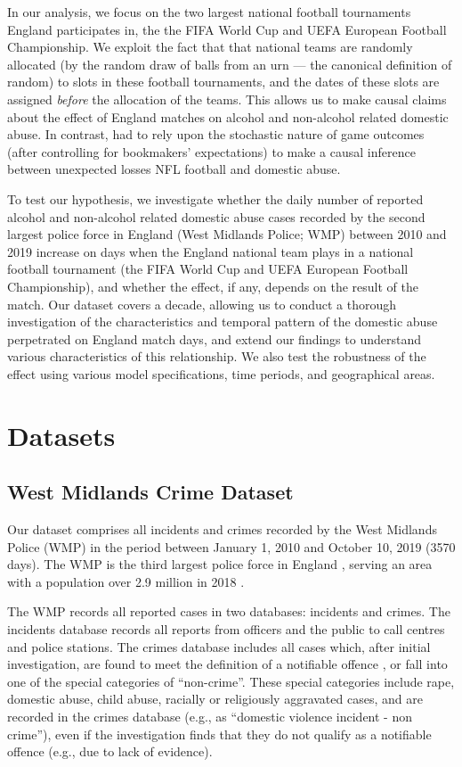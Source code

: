 \documentclass[12pt, a4paper]{article}
\begin{document}
In our analysis, we focus on the two largest national football tournaments England participates in, the the FIFA World Cup and UEFA European Football Championship. We exploit the fact that that national teams are randomly allocated (by the random draw of balls from an urn --- the canonical definition of random) to slots in these football tournaments, and the dates of these slots are assigned \emph{before} the allocation of the teams. This allows us to make causal claims about the effect of England matches on alcohol and non-alcohol related domestic abuse. In contrast,  had to rely upon the stochastic nature of game outcomes (after controlling for bookmakers' expectations) to make a causal inference between unexpected losses NFL football and domestic abuse. 

To test our hypothesis, we investigate whether the daily number of reported alcohol and non-alcohol related domestic abuse cases recorded by the second largest police force in England (West Midlands Police; WMP) between 2010 and 2019 increase on days when the England national team plays in a national football tournament (the FIFA World Cup and UEFA European Football Championship), and whether the effect, if any, depends on the result of the match. Our dataset covers a decade, allowing us to conduct a thorough investigation of the characteristics and temporal pattern of the domestic abuse perpetrated on England match days, and extend our findings to understand various characteristics of this relationship. We also test the robustness of the effect using various model specifications, time periods, and geographical areas. 



\section{Datasets}

\subsection{West Midlands Crime Dataset}


Our dataset comprises all incidents and crimes recorded by the West Midlands Police (WMP) in the period between January 1, 2010 and October 10, 2019 (3570 days). The WMP is the third largest police force in England \cite{Homeoffice}, serving an area with a population over 2.9 million in 2018 \cite{populationfigure}. 

The WMP records all reported cases in two databases: incidents and crimes. The incidents database records all reports from officers and the public to call centres and police stations. The crimes database includes all cases which, after initial investigation, are found to meet the definition of a notifiable offence , or fall into one of the special categories of ``non-crime''. These special categories include rape, domestic abuse, child abuse, racially or religiously aggravated cases, and are recorded in the crimes database (e.g., as ``domestic violence incident - non crime''), even if the investigation finds that they do not qualify as a notifiable offence (e.g., due to lack of evidence).
 
\end{document}
